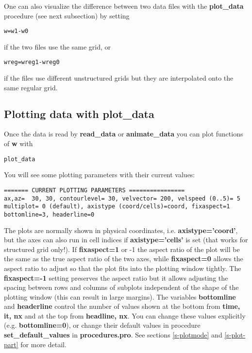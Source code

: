 \documentclass{article}
\begin{document}
One can also visualize the difference between two data files 
with the {\bf plot\_data} procedure (see next subsection) by setting
\begin{verbatim}
w=w1-w0
\end{verbatim}
   if the two files use the same grid, or
\begin{verbatim}
wreg=wreg1-wreg0
\end{verbatim}
if the files use different unstructured grids but they are 
interpolated onto the same regular grid.

\subsection{Plotting data with plot\_data \label{s-plot_data}}

   Once the data is read by {\bf read\_data} or {\bf animate\_data} you can plot 
   functions of {\bf w} with
\begin{verbatim}
plot_data
\end{verbatim}
   You will see some plotting parameters with their current values:
\begin{verbatim}
======= CURRENT PLOTTING PARAMETERS ================
ax,az=  30, 30, contourlevel= 30, velvector= 200, velspeed (0..5)= 5
multiplot= 0 (default), axistype (coord/cells)=coord, fixaspect=1
bottomline=3, headerline=0
\end{verbatim}
   The plots are normally shown in physical coordinates, i.e.
   {\bf axistype='coord'}, but the axes can also run in cell indices 
   if {\bf axistype='cells'} is set (that works for structured grid only!).
   If {\bf fixaspect=1} or -1 the aspect ratio of the plot will be the same
   as the true aspect ratio of the two axes, while {\bf fixaspect=0} allows
   the aspect ratio to adjust so that 
   the plot fits into the plotting window tightly. The {\bf fixaspect=-1}
   setting preserves the aspect ratio but it allows adjusting the spacing 
   between rows and columns of subplots independent of the shape
   of the plotting window (this can result in large margins).
   The variables {\bf bottomline} and {\bf headerline} control the number
   of values shown at the bottom from {\bf time, it, nx} and at the top 
   from {\bf headline, nx}.
   You can change these values explicitly (e.g. {\bf bottomline=0}), or change 
   their default values in procedure {\bf set\_default\_values} in {\bf procedures.pro}. 
   See sections \ref{s-plotmode} and \ref{s-plot-part} for more detail.
\end{document}
